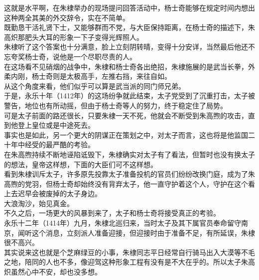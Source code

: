 \begin{multicols}{\theparacolNo}
这就是水平啊，在朱棣举办的现场提问回答活动中，杨士奇能够在规定时间内想出这种两全其美的外交辞令，实在不简单。\\

既勤恳干活礼贤下士，又能够群而不党，与大臣保持距离，在杨士奇的描述下，朱高炽那肥头大耳的形象一下子变得光辉照人。\\

朱棣听了这个答案也十分满意，脸上立刻阴转晴，变得十分安详，当然最后他还不忘夸奖杨士奇，说他是一个尽职尽责的人。\\

在这场看不见硝烟的战争中，朱棣和杨士奇各出绝招，朱棣施展的是武当长拳，外柔内刚，杨士奇则是太极高手，左推右挡，来往自如。\\

从这个角度来看，他们似乎可以算是武当派的同门师兄弟。\\

于是，永乐十年（1412年）的这场纷争就此结束，太子党受到了沉重打击，太子被警告，地位也有所动摇，但由于杨士奇等人的努力，终于稳定住了局势。\\

可是太子前面的路还很长，只要朱棣一天不死，他就会不断受到朱高煦的攻击，直到他登上皇位或是中途死去。\\

事实也是如此，另一个更大的阴谋正在策划之中，对太子而言，这也将是他监国二十年中经受的最严酷的考验。\\

在朱高煦持续不断地诬陷诋毁下，朱棣确实对太子有了看法，但暂时也没有换太子的想法，皇帝这样想，下面的大臣们可不这样想。\\

看到朱棣训斥太子，许多原先投靠太子准备投机的官员们纷纷改换门庭，成为了朱高煦的党羽，但杨士奇却始终没有背弃太子，他一直守护着这个人，守护在这个看上去迟早会被废掉的太子身边。\\

大浪淘沙，始见真金。\\

不久之后，一场更大的风暴到来了，太子和杨士奇将接受真正的考验。\\

永乐十二年（1414年）九月，朱棣北巡归来，当时太子及其下属官员奉命留守南京，闻听这个消息，立刻派人准备迎接，但迎接时由于准备不足，有所延误，朱棣很不高兴。\\

其实说来这也就是个芝麻绿豆的小事，朱棣同志平日经常自行骑马出入大漠等不毛之地，陪同的人也不多，像迎驾这种形象工程有没有是不大在乎的。所以太子朱高炽虽然心中不安，却也没多想。\\


\end{multicols}

